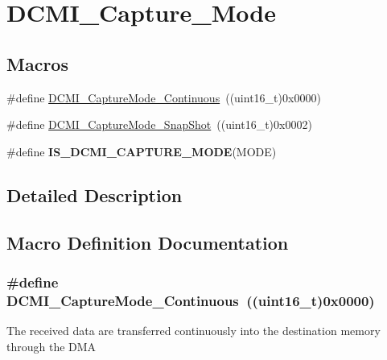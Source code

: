 \hypertarget{group___d_c_m_i___capture___mode}{}\section{D\+C\+M\+I\+\_\+\+Capture\+\_\+\+Mode}
\label{group___d_c_m_i___capture___mode}
\subsection*{Macros}
\begin{DoxyCompactItemize}
\item 
\#define \hyperlink{group___d_c_m_i___capture___mode_gafc4b1ac09dcbc966fd0626d388b3e34b}{D\+C\+M\+I\+\_\+\+Capture\+Mode\+\_\+\+Continuous}~((uint16\+\_\+t)0x0000)
\item 
\#define \hyperlink{group___d_c_m_i___capture___mode_ga2be97e0095cc139fa20fe07a74c81fd0}{D\+C\+M\+I\+\_\+\+Capture\+Mode\+\_\+\+Snap\+Shot}~((uint16\+\_\+t)0x0002)
\item 
\#define {\bfseries I\+S\+\_\+\+D\+C\+M\+I\+\_\+\+C\+A\+P\+T\+U\+R\+E\+\_\+\+M\+O\+D\+E}(M\+O\+D\+E)
\end{DoxyCompactItemize}


\subsection{Detailed Description}


\subsection{Macro Definition Documentation}
\hypertarget{group___d_c_m_i___capture___mode_gafc4b1ac09dcbc966fd0626d388b3e34b}{}
\subsubsection[{D\+C\+M\+I\+\_\+\+Capture\+Mode\+\_\+\+Continuous}]{\setlength{\rightskip}{0pt plus 5cm}\#define D\+C\+M\+I\+\_\+\+Capture\+Mode\+\_\+\+Continuous~((uint16\+\_\+t)0x0000)}\label{group___d_c_m_i___capture___mode_gafc4b1ac09dcbc966fd0626d388b3e34b}
The received data are transferred continuously into the destination memory through the D\+M\+A \hypertarget{group___d_c_m_i___capture___mode_ga2be97e0095cc139fa20fe07a74c81fd0}{}
